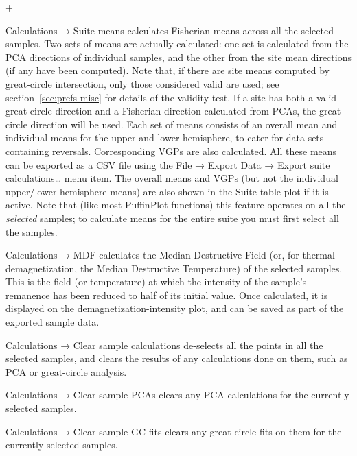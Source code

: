 \documentclass[a4paper,british]{article}
\newcommand{\menuitemlabel}[1]{%
\mbox{\textsf{#1}}\hfil}
\newenvironment{menuitemlist}%
{\begin{list}{}{%
\renewcommand{\makelabel}{\menuitemlabel}%
\setlength{\labelwidth}{35pt}%
\setlength{\leftmargin}%
             {\labelwidth+\labelsep}}}%
{\end{list}}
\newcommand{\ppcmd}[1]{\textsf{#1}} %
\newcommand{\caps}[1]{\MakeTextUppercase{#1}} %
\newcommand{\submenu}{ \textrm{→} }
\begin{document}
\begin{menuitemlist}
\item[Calculations\submenu Suite means] calculates Fisherian means
  across all the selected samples. Two sets of means are actually
  calculated: one set is calculated from the \caps{pca} directions of
  individual samples, and the other from the site mean directions (if
  any have been computed). Note that, if there are site means computed
  by great-circle intersection, only those considered valid are used;
  see section~\ref{sec:prefs-misc} for details of the validity test. If
  a site has both a valid great-circle direction and a Fisherian
  direction calculated from PCAs, the great-circle direction will be
  used. Each set of means consists of an overall mean and individual
  means for the upper and lower hemisphere, to cater for data sets
  containing reversals. Corresponding VGPs are also calculated. All
  these means can be exported as a \caps{csv} file using the
  \ppcmd{File\submenu Export Data\submenu Export suite
    calculations\ldots} menu item. The overall means and VGPs (but not
  the individual upper/lower hemisphere means) are also shown in the
  \ppcmd{Suite table} plot if it is active. Note that (like most
  PuffinPlot functions) this feature operates on all the \emph{selected}
  samples; to calculate means for the entire suite you must first select
  all the samples.

\item[Calculations\submenu MDF] calculates the Median Destructive Field (or,
  for thermal demagnetization, the Median Destructive Temperature) of the
  selected samples. This is the field (or temperature) at which the intensity
  of the sample's remanence has been reduced to half of its initial value.
  Once calculated, it is displayed on the demagnetization-intensity plot, and
  can be saved as part of the exported sample data.

\item[Calculations\submenu Clear sample calculations] de-selects all the
  points in all the selected samples, and clears the results of any
  calculations done on them, such as \caps{pca} or great-circle analysis.

\item[Calculations\submenu Clear sample PCAs] clears any
  \caps{pca} calculations for the currently selected samples.

\item[Calculations\submenu Clear sample GC fits] clears any
  great-circle fits on them for the currently selected samples.


\end{menuitemlist}
\end{document}
